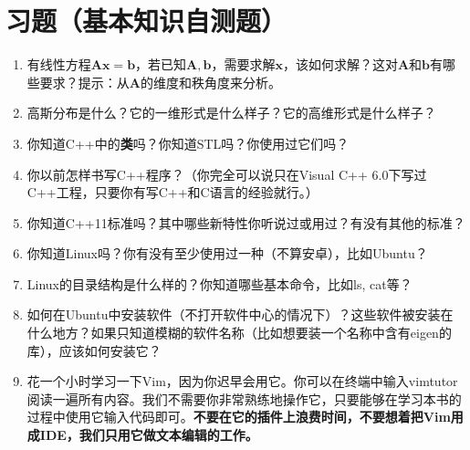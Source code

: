 \section*{习题（基本知识自测题）}
\begin{enumerate}
	\item 有线性方程$\bm{A} \bm{x} = \bm{b}$，若已知$\bm{A}, \bm{b}$，需要求解$\bm{x}$，该如何求解？这对$\bm{A}$和$\bm{b}$有哪些要求？提示：从$\bm{A}$的维度和秩角度来分析。
	\item 高斯分布是什么？它的一维形式是什么样子？它的高维形式是什么样子？
	\item 你知道C++中的\textbf{类}吗？你知道STL吗？你使用过它们吗？
	\item 你以前怎样书写C++程序？（你完全可以说只在Visual C++ 6.0下写过C++工程，只要你有写C++和C语言的经验就行。）
	\item 你知道C++11标准吗？其中哪些新特性你听说过或用过？有没有其他的标准？
	\item 你知道Linux吗？你有没有至少使用过一种（不算安卓），比如Ubuntu？
	\item Linux的目录结构是什么样的？你知道哪些基本命令，比如ls, cat等？
	\item 如何在Ubuntu中安装软件（不打开软件中心的情况下）？这些软件被安装在什么地方？如果只知道模糊的软件名称（比如想要装一个名称中含有eigen的库），应该如何安装它？
	\item[\optional] 花一个小时学习一下Vim，因为你迟早会用它。你可以在终端中输入vimtutor阅读一遍所有内容。我们不需要你非常熟练地操作它，只要能够在学习本书的过程中使用它输入代码即可。\textbf{不要在它的插件上浪费时间，不要想着把Vim用成IDE，我们只用它做文本编辑的工作。}
\end{enumerate}